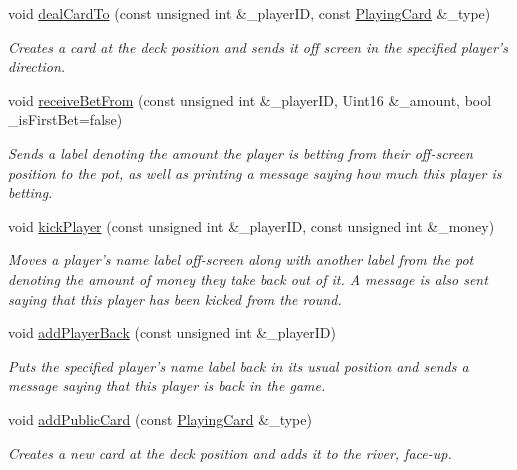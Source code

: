 \begin{DoxyCompactItemize}
void \hyperlink{classGUI_1_1DealerGUI_a7a3dfe5dd93b0fdd1d1a81c5045848f9}{deal\-Card\-To} (const unsigned int \&\-\_\-player\-I\-D, const \hyperlink{classPlayingCard}{Playing\-Card} \&\-\_\-type)
\begin{DoxyCompactList}\small\item\em Creates a card at the deck position and sends it off screen in the specified player's direction. \end{DoxyCompactList}\item 
void \hyperlink{classGUI_1_1DealerGUI_a2e6063744ea37610274ae27cfdfa22b4}{receive\-Bet\-From} (const unsigned int \&\-\_\-player\-I\-D, Uint16 \&\-\_\-amount, bool \-\_\-is\-First\-Bet=false)
\begin{DoxyCompactList}\small\item\em Sends a label denoting the amount the player is betting from their off-\/screen position to the pot, as well as printing a message saying how much this player is betting. \end{DoxyCompactList}\item 
void \hyperlink{classGUI_1_1DealerGUI_a9a72c24d2f1b21a1727d4fe8e566a333}{kick\-Player} (const unsigned int \&\-\_\-player\-I\-D, const unsigned int \&\-\_\-money)
\begin{DoxyCompactList}\small\item\em Moves a player's name label off-\/screen along with another label from the pot denoting the amount of money they take back out of it. A message is also sent saying that this player has been kicked from the round. \end{DoxyCompactList}\item 
void \hyperlink{classGUI_1_1DealerGUI_a77dc22fd5e7ca39e8f39e1253b2d89ff}{add\-Player\-Back} (const unsigned int \&\-\_\-player\-I\-D)
\begin{DoxyCompactList}\small\item\em Puts the specified player's name label back in its usual position and sends a message saying that this player is back in the game. \end{DoxyCompactList}\item 
void \hyperlink{classGUI_1_1DealerGUI_affba353381b0d13f70c710b74d748b19}{add\-Public\-Card} (const \hyperlink{classPlayingCard}{Playing\-Card} \&\-\_\-type)
\begin{DoxyCompactList}\small\item\em Creates a new card at the deck position and adds it to the river, face-\/up. \end{DoxyCompactList}\item 

\end{DoxyCompactItemize}
